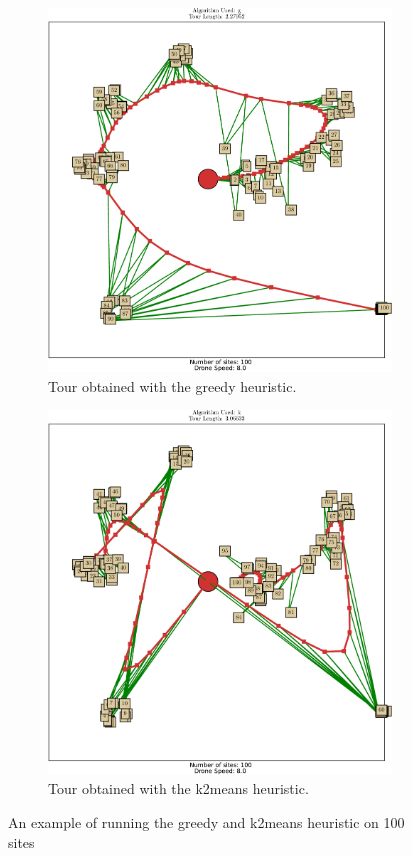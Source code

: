 \documentclass[conference]{IEEEtran}
\begin{document}
\begin{figure}[h!]
\centering
\begin{subfigure}[b]{0.55\textwidth}
  \includegraphics[width=0.8\columnwidth]{img/greedy_example.pdf}
  \caption{Tour obtained with the greedy heuristic.}
\end{subfigure}
\vspace{0.3cm}

\begin{subfigure}[b]{0.55\textwidth}
   \includegraphics[width=0.8\columnwidth]{img/k2means_example.pdf}
   \caption{Tour obtained with the k2means heuristic.}
 \end{subfigure}
\caption{An example of running the greedy and k2means heuristic on 100 sites}
\label{fig:compareheuristics_example}
\end{figure}
\end{document}
